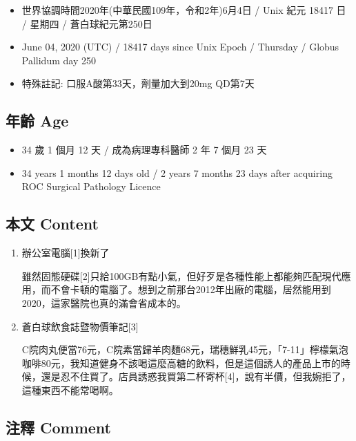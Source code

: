 \documentclass[
]{article}
\providecommand{\tightlist}{%
  \setlength{\itemsep}{0pt}\setlength{\parskip}{0pt}}
\begin{document}
\begin{itemize}
\tightlist
\item
  世界協調時間2020年(中華民國109年，令和2年)6月4日 / Unix 紀元 18417 日
  / 星期四 / 蒼白球紀元第250日
\item
  June 04, 2020 (UTC) / 18417 days since Unix Epoch / Thursday / Globus
  Pallidum day 250
\item
  特殊註記: 口服A酸第33天，劑量加大到20mg QD第7天
\end{itemize}

\hypertarget{ux5e74ux9f61-age-3}{%
\subsection{年齡 Age}\label{ux5e74ux9f61-age-3}}

\begin{itemize}
\tightlist
\item
  34 歲 1 個月 12 天 / 成為病理專科醫師 2 年 7 個月 23 天
\item
  34 years 1 months 12 days old / 2 years 7 months 23 days after
  acquiring ROC Surgical Pathology Licence
\end{itemize}

\hypertarget{ux672cux6587-content-3}{%
\subsection{本文 Content}\label{ux672cux6587-content-3}}

\begin{enumerate}
\def\labelenumi{\arabic{enumi}.}
\item
  辦公室電腦{[}1{]}換新了

  雖然固態硬碟{[}2{]}只給100GB有點小氣，但好歹是各種性能上都能夠匹配現代應用，而不會卡頓的電腦了。想到之前那台2012年出廠的電腦，居然能用到2020，這家醫院也真的滿會省成本的。
\item
  蒼白球飲食誌暨物價筆記{[}3{]}

  C院肉丸便當76元，C院素當歸羊肉麵68元，瑞穗鮮乳45元，「7-11」檸檬氣泡咖啡80元，我知道健身不該喝這麼高糖的飲料，但是這個誘人的產品上市的時候，還是忍不住買了。店員誘惑我買第二杯寄杯{[}4{]}，說有半價，但我婉拒了，這種東西不能常喝啊。
\end{enumerate}

\hypertarget{ux6ce8ux91cb-comment-3}{%
\subsection{注釋 Comment}\label{ux6ce8ux91cb-comment-3}}
\end{document}
